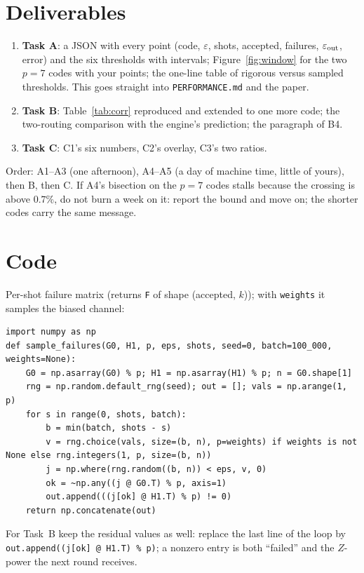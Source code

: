 \documentclass[11pt]{article}
\newcommand{\eps}{\varepsilon}
\newcommand{\code}[1]{\texttt{#1}}
\begin{document}
\section{Deliverables}

\begin{enumerate}[nosep]
\item \textbf{Task A}: a JSON with every point (code, $\eps$, shots, accepted,
  failures, $\eps_{\rm out}$, error) and the six thresholds with intervals;
  Figure~\ref{fig:window} for the two $p=7$ codes with your points; the one-line
  table of rigorous versus sampled thresholds. This goes straight into
  \code{PERFORMANCE.md} and the paper.
\item \textbf{Task B}: Table~\ref{tab:corr} reproduced and extended to one more
  code; the two-routing comparison with the engine's prediction; the paragraph of B4.
\item \textbf{Task C}: C1's six numbers, C2's overlay, C3's two ratios.
\end{enumerate}

Order: A1--A3 (one afternoon), A4--A5 (a day of machine time, little of yours), then
B, then C. If A4's bisection on the $p=7$ codes stalls because the crossing is above
$0.7\%$, do not burn a week on it: report the bound and move on; the shorter codes
carry the same message.

\appendix
\section{Code}\label{app:code}

Per-shot failure matrix (returns \code{F} of shape (accepted, $k$)); with
\code{weights} it samples the biased channel:
\begin{lstlisting}
import numpy as np
def sample_failures(G0, H1, p, eps, shots, seed=0, batch=100_000, weights=None):
    G0 = np.asarray(G0) % p; H1 = np.asarray(H1) % p; n = G0.shape[1]
    rng = np.random.default_rng(seed); out = []; vals = np.arange(1, p)
    for s in range(0, shots, batch):
        b = min(batch, shots - s)
        v = rng.choice(vals, size=(b, n), p=weights) if weights is not None else rng.integers(1, p, size=(b, n))
        j = np.where(rng.random((b, n)) < eps, v, 0)
        ok = ~np.any((j @ G0.T) % p, axis=1)
        out.append(((j[ok] @ H1.T) % p) != 0)
    return np.concatenate(out)
\end{lstlisting}
For Task~B keep the residual values as well: replace the last line of the loop by
\code{out.append((j[ok] @ H1.T) \% p)}; a nonzero entry is both ``failed'' and the
$Z$-power the next round receives.
\end{document}
